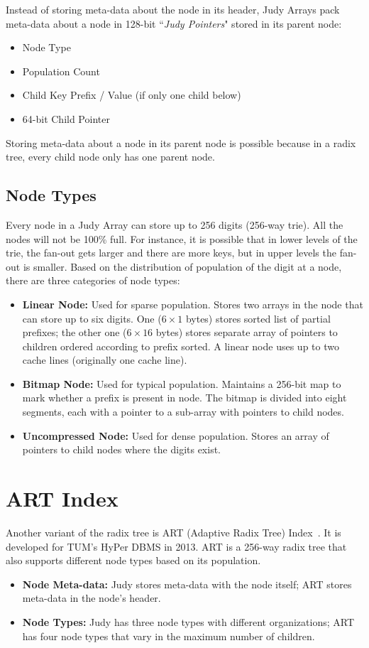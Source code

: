 \documentclass[11pt]{article}
\begin{document}
Instead of storing meta-data about the node in its header, Judy Arrays pack meta-data about a node in 128-bit ``\textit{Judy Pointers}" stored in its parent node:
\begin{itemize}
    \item Node Type
    \item Population Count
    \item Child Key Prefix / Value (if only one child below)
    \item 64-bit Child Pointer
\end{itemize}
Storing meta-data about a node in its parent node is possible because in a radix tree, every child node only has one parent node.

\subsection*{Node Types}
Every node in a Judy Array can store up to 256 digits (256-way trie). All the nodes will not be 100\% full. For instance, it is possible that in lower levels of the trie, the fan-out gets larger and there are more keys, but in upper levels the fan-out is smaller. Based on the distribution of population of the digit at a node, there are three categories of node types:
\begin{itemize}
    \item \textbf{Linear Node:} Used for sparse population. Stores two arrays in the node that can store up to six digits. One ($6\times1$ bytes) stores sorted list of partial prefixes; the other one ($6\times16$ bytes) stores separate array of pointers to children ordered according to prefix sorted. A linear node uses up to two cache lines (originally one cache line).
    \item \textbf{Bitmap Node:} Used for typical population. Maintains a 256-bit map to mark whether a prefix is present in node. The bitmap is divided into eight segments, each with a pointer to a sub-array with pointers to child nodes.
    \item \textbf{Uncompressed Node:} Used for dense population. Stores an array of pointers to child nodes where the digits exist.
\end{itemize}

\section{ART Index}
Another variant of the radix tree is ART (Adaptive Radix Tree) Index~\cite{leis-icde2013}. It is developed for TUM's HyPer DBMS in 2013. ART is a 256-way radix tree that also supports different node types based on its population.
\begin{itemize}
    \item \textbf{Node Meta-data:} Judy stores meta-data with the node itself; ART stores meta-data in the node's header.
    \item \textbf{Node Types:} Judy has three node types with different organizations; ART has four node types that vary in the maximum number of children.
\end{itemize}
\end{document}

